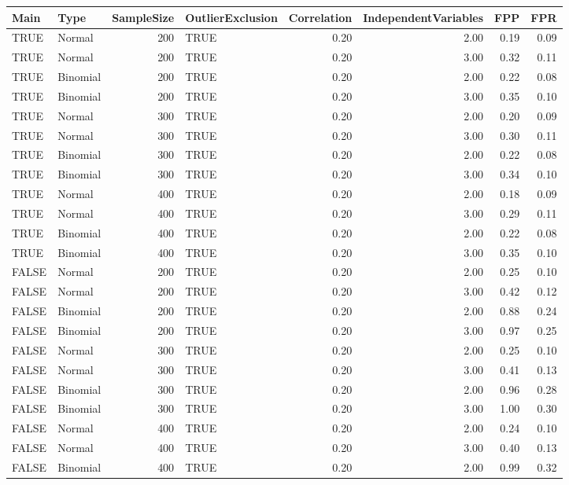 \begin{longtable}{llrlrrrr}
  \hline
Main & Type & SampleSize & OutlierExclusion & Correlation & IndependentVariables & FPP & FPR \\ 
  \hline
TRUE & Normal & 200 & TRUE & 0.20 & 2.00 & 0.19 & 0.09 \\ 
  TRUE & Normal & 200 & TRUE & 0.20 & 3.00 & 0.32 & 0.11 \\ 
  TRUE & Binomial & 200 & TRUE & 0.20 & 2.00 & 0.22 & 0.08 \\ 
  TRUE & Binomial & 200 & TRUE & 0.20 & 3.00 & 0.35 & 0.10 \\ 
  TRUE & Normal & 300 & TRUE & 0.20 & 2.00 & 0.20 & 0.09 \\ 
  TRUE & Normal & 300 & TRUE & 0.20 & 3.00 & 0.30 & 0.11 \\ 
  TRUE & Binomial & 300 & TRUE & 0.20 & 2.00 & 0.22 & 0.08 \\ 
  TRUE & Binomial & 300 & TRUE & 0.20 & 3.00 & 0.34 & 0.10 \\ 
  TRUE & Normal & 400 & TRUE & 0.20 & 2.00 & 0.18 & 0.09 \\ 
  TRUE & Normal & 400 & TRUE & 0.20 & 3.00 & 0.29 & 0.11 \\ 
  TRUE & Binomial & 400 & TRUE & 0.20 & 2.00 & 0.22 & 0.08 \\ 
  TRUE & Binomial & 400 & TRUE & 0.20 & 3.00 & 0.35 & 0.10 \\ 
  FALSE & Normal & 200 & TRUE & 0.20 & 2.00 & 0.25 & 0.10 \\ 
  FALSE & Normal & 200 & TRUE & 0.20 & 3.00 & 0.42 & 0.12 \\ 
  FALSE & Binomial & 200 & TRUE & 0.20 & 2.00 & 0.88 & 0.24 \\ 
  FALSE & Binomial & 200 & TRUE & 0.20 & 3.00 & 0.97 & 0.25 \\ 
  FALSE & Normal & 300 & TRUE & 0.20 & 2.00 & 0.25 & 0.10 \\ 
  FALSE & Normal & 300 & TRUE & 0.20 & 3.00 & 0.41 & 0.13 \\ 
  FALSE & Binomial & 300 & TRUE & 0.20 & 2.00 & 0.96 & 0.28 \\ 
  FALSE & Binomial & 300 & TRUE & 0.20 & 3.00 & 1.00 & 0.30 \\ 
  FALSE & Normal & 400 & TRUE & 0.20 & 2.00 & 0.24 & 0.10 \\ 
  FALSE & Normal & 400 & TRUE & 0.20 & 3.00 & 0.40 & 0.13 \\ 
  FALSE & Binomial & 400 & TRUE & 0.20 & 2.00 & 0.99 & 0.32 \\ 

\end{longtable}
